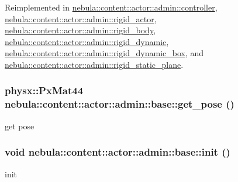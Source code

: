 Reimplemented in \hyperlink{classnebula_1_1content_1_1actor_1_1admin_1_1controller_a8f4df19230f21a264d3325a5fcd5c1fa}{nebula::content::actor::admin::controller}, \hyperlink{classnebula_1_1content_1_1actor_1_1admin_1_1rigid__actor_a6a7daf14ba48ebe539588bfc18784267}{nebula::content::actor::admin::rigid\_\-actor}, \hyperlink{classnebula_1_1content_1_1actor_1_1admin_1_1rigid__body_a649883f2e1d157c2b94cc475f458a3c4}{nebula::content::actor::admin::rigid\_\-body}, \hyperlink{classnebula_1_1content_1_1actor_1_1admin_1_1rigid__dynamic_a263f07931e9281ea4044c522b567dde1}{nebula::content::actor::admin::rigid\_\-dynamic}, \hyperlink{classnebula_1_1content_1_1actor_1_1admin_1_1rigid__dynamic__box_ad0aba702fbf1cb38fabc3b84f6a2ef93}{nebula::content::actor::admin::rigid\_\-dynamic\_\-box}, and \hyperlink{classnebula_1_1content_1_1actor_1_1admin_1_1rigid__static__plane_ad967d0a5cd7a1ee7864c28f6b73aff80}{nebula::content::actor::admin::rigid\_\-static\_\-plane}.\hypertarget{classnebula_1_1content_1_1actor_1_1admin_1_1base_aeed6764a0a4cae99847e989268052f1e}{
\subsubsection[{get\_\-pose}]{\setlength{\rightskip}{0pt plus 5cm}physx::PxMat44 nebula::content::actor::admin::base::get\_\-pose ()}}
\label{classnebula_1_1content_1_1actor_1_1admin_1_1base_aeed6764a0a4cae99847e989268052f1e}


get pose \hypertarget{classnebula_1_1content_1_1actor_1_1admin_1_1base_ab7aac539b0e1e06102bbb4b572d529cd}{
\subsubsection[{init}]{\setlength{\rightskip}{0pt plus 5cm}void nebula::content::actor::admin::base::init ()}}
\label{classnebula_1_1content_1_1actor_1_1admin_1_1base_ab7aac539b0e1e06102bbb4b572d529cd}


init 

